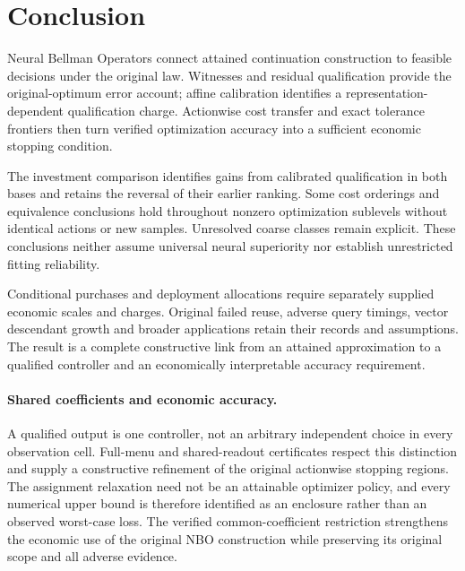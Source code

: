 \documentclass[ecta,nameyear,draft]{econsocart}
\begin{document}











\section{Conclusion}\label{sec:conclusion65}
Neural Bellman Operators connect attained continuation construction to feasible decisions under the original law. Witnesses and residual qualification provide the original-optimum error account; affine calibration identifies a representation-dependent qualification charge. Actionwise cost transfer and exact tolerance frontiers then turn verified optimization accuracy into a sufficient economic stopping condition.

The investment comparison identifies gains from calibrated qualification in both bases and retains the reversal of their earlier ranking. Some cost orderings and equivalence conclusions hold throughout nonzero optimization sublevels without identical actions or new samples. Unresolved coarse classes remain explicit. These conclusions neither assume universal neural superiority nor establish unrestricted fitting reliability.

Conditional purchases and deployment allocations require separately supplied economic scales and charges. Original failed reuse, adverse query timings, vector descendant growth and broader applications retain their records and assumptions. The result is a complete constructive link from an attained approximation to a qualified controller and an economically interpretable accuracy requirement.

\paragraph{Shared coefficients and economic accuracy.}
A qualified output is one controller, not an arbitrary independent choice in every observation cell. Full-menu and shared-readout certificates respect this distinction and supply a constructive refinement of the original actionwise stopping regions. The assignment relaxation need not be an attainable optimizer policy, and every numerical upper bound is therefore identified as an enclosure rather than an observed worst-case loss. The verified common-coefficient restriction strengthens the economic use of the original NBO construction while preserving its original scope and all adverse evidence.
\end{document}

